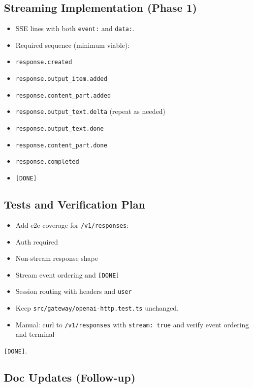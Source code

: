 \subsection{Streaming Implementation (Phase 1)}


\begin{itemize}
  \item SSE lines with both \texttt{event:} and \texttt{data:}.
  \item Required sequence (minimum viable):
  \item \texttt{response.created}
  \item \texttt{response.output\_item.added}
  \item \texttt{response.content\_part.added}
  \item \texttt{response.output\_text.delta} (repeat as needed)
  \item \texttt{response.output\_text.done}
  \item \texttt{response.content\_part.done}
  \item \texttt{response.completed}
  \item \texttt{[DONE]}
\end{itemize}


\subsection{Tests and Verification Plan}


\begin{itemize}
  \item Add e2e coverage for \texttt{/v1/responses}:
  \item Auth required
  \item Non-stream response shape
  \item Stream event ordering and \texttt{[DONE]}
  \item Session routing with headers and \texttt{user}
  \item Keep \texttt{src/gateway/openai-http.test.ts} unchanged.
  \item Manual: curl to \texttt{/v1/responses} with \texttt{stream: true} and verify event ordering and terminal
\end{itemize}

\texttt{[DONE]}.

\subsection{Doc Updates (Follow-up)}


